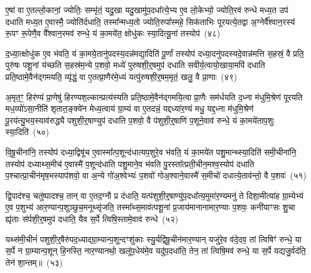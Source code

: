 {\anuvakamend[{ए॒ष वै प॒शुर्यम॑सर्पदे॒ष यत्तस्मा॒त्तस्मा᳚थ्स॒प्तविꣳ॑शतिश्च}]}%

ए॒षां वा ए॒तल्लो॒कानां॒ ज्योतिः॒ सम्भृ॑तं॒ यदु॒खा यदु॒खामु॑प॒दधा᳚त्ये॒भ्य ए॒व लो॒केभ्यो॒ ज्योति॒रव॑ रुन्धे मध्य॒त उप॑ दधाति मध्य॒त ए॒वास्मै॒ ज्योति॑र्दधाति॒ तस्मा᳚न्मध्य॒तो ज्योति॒रुपा᳚स्महे॒ सिक॑ताभिः पूरयत्ये॒तद्वा अ॒ग्नेर्वै᳚श्वान॒रस्य॑ रू॒पꣳ रू॒पेणै॒व वै᳚श्वान॒रमव॑ रुन्धे॒ यं का॒मये॑त॒ क्षोधु॑कः स्या॒दित्यू॒नां तस्योप॑~(४८)

द॒ध्या॒त्क्षोधु॑क ए॒व भ॑वति॒ यं का॒मये॒तानु॑पदस्य॒दन्न॑मद्या॒दिति॑ पू॒र्णां तस्योप॑ दध्या॒दनु॑पदस्यदे॒वान्न॑मत्ति स॒हस्रं॒ वै प्रति॒ पुरु॑षः पशू॒नां य॑च्छति स॒हस्र॑म॒न्ये प॒शवो॒ मध्ये॑ पुरुषशी॒र्॒\mbox{}षमुप॑ दधाति सवीर्य॒त्वायो॒खाया॒मपि॑ दधाति प्रति॒ष्ठामे॒वैन॑द्गमयति॒ व्यृ॑द्धं॒ वा ए॒तत्प्रा॒णैर॑मे॒ध्यं यत्पु॑रुषशी॒र्॒\mbox{}षम॒मृतं॒ खलु॒ वै प्रा॒णाः~(४९)

अ॒मृत॒ꣳ॒ हिर॑ण्यं प्रा॒णेषु॑ हिरण्यश॒ल्कान्प्रत्य॑स्यति प्रति॒ष्ठामे॒वैन॑द्गमयि॒त्वा प्रा॒णैः सम॑र्धयति द॒ध्ना म॑धुमि॒श्रेण॑ पूरयति मध॒व्यो॑\-ऽसा॒नीति॑ शृतात॒ङ्क्ये॑न मेध्य॒त्वाय॑ ग्रा॒म्यं वा ए॒तदन्नं॒ यद्दध्या॑र॒ण्यं मधु॒ यद्द॒ध्ना म॑धुमि॒श्रेण॑ पू॒रय॑त्यु॒भय॒स्याव॑रुद्ध्यै पशुशी॒र्॒\mbox{}षाण्युप॑ दधाति प॒शवो॒ वै प॑शुशी॒र्॒\mbox{}षाणि॑ प॒शूने॒वाव॑ रुन्धे॒ यं का॒मये॑ताप॒शुः स्या॒दिति॑~(५०)

वि॒षू॒चीना॑नि॒ तस्योप॑ दध्या॒द्विषू॑च ए॒वास्मा᳚त्प॒शून्द॑धात्यप॒शुरे॒व भ॑वति॒ यं का॒मये॑त पशु॒मान्थ्स्या॒दिति॑ समी॒चीना॑नि॒ तस्योप॑ दध्याथ्स॒मीच॑ ए॒वास्मै॑ प॒शून्द॑धाति पशु॒माने॒व भ॑वति पु॒रस्ता᳚त्प्रती॒चीन॒मश्व॒स्योप॑ दधाति प॒श्चात्प्रा॒चीन॑मृष॒भस्याप॑शवो॒ वा अ॒न्ये गो॑अ॒श्वेभ्यः॑ प॒शवो॑ गोअ॒श्वाने॒वास्मै॑ स॒मीचो॑ दधात्ये॒ताव॑न्तो॒ वै प॒शवः॑~(५१)

द्वि॒पाद॑श्च॒ चतु॑ष्पादश्च॒ तान् वा ए॒तद॒ग्नौ प्र द॑धाति॒ यत्प॑शुशी॒र्॒\mbox{}षाण्यु॑प॒दधा᳚त्य॒मुमा॑र॒ण्यमनु॑ ते दिशा॒मीत्या॑ह ग्रा॒म्येभ्य॑ ए॒व प॒शुभ्य॑ आर॒ण्यान्प॒शूञ्छुच॒मनूथ्सृ॑जति॒ तस्मा᳚थ्स॒माव॑त्पशू॒नां प्र॒जाय॑मानानामार॒ण्याः प॒शवः॒ कनी॑याꣳसः शु॒चा ह्यृ॑ताः स॑र्पशी॒र्॒\mbox{}षमुप॑ दधाति॒ यैव स॒र्पे त्विषि॒स्तामे॒वाव॑ रुन्धे~(५२)

यथ्स॑मी॒चीनं॑ पशुशी॒र्॒\mbox{}षैरु॑पद॒ध्याद्ग्रा॒म्यान्प॒शून्दꣳशु॑काः स्यु॒र्यद्वि॑षू॒चीन॑मार॒ण्यान् यजु॑रे॒व व॑दे॒दव॒ तां त्विषिꣳ॑ रुन्धे॒ या स॒र्पे न ग्रा॒म्यान्प॒शून् हि॒नस्ति॒ नार॒ण्यानथो॒ खलू॑प॒धेय॑मे॒व यदु॑प॒दधा॑ति॒ तेन॒ तां त्विषि॒मव॑ रुन्धे॒ या स॒र्पे यद्यजु॒र्वद॑ति॒ तेन॑ शा॒न्तम्॥~(५३)

{\anuvakamend[{ऊ॒नान्तस्योप॑ प्रा॒णाः स्या॒दिति॒ वै प॒शवो॑ रुन्धे॒ चतु॑श्चत्वारिꣳशच्च}]}%

